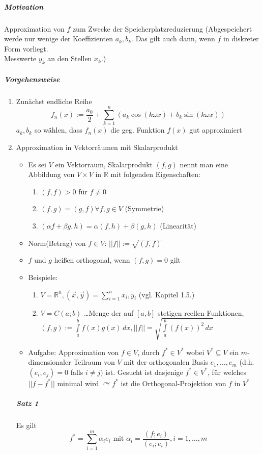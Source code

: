 \documentclass[a4paper]{scrartcl}
\begin{document}
\subparagraph{Motivation} Approximation von $f$ zum Zwecke der Speicherplatzreduzierung (Abgespeichert werde nur wenige der Koeffizienten $a_k,b_k$. Das gilt auch dann, wenn $f$ in diskreter Form vorliegt.\\
Messwerte $y_k$ an den Stellen $x_k$.)

\subparagraph{Vorgehensweise}
\begin{enumerate}
\item Zunächst endliche Reihe
\begin{equation}\label{4521} f_n(x) := \frac{a_0}{2} + \sum\limits_{k=1}^{n} (a_k \cos{(k\omega x)} + b_k \sin{(k\omega x)} )
\end{equation}
$a_k,b_k$ so wählen, dass $f_n(x)$ die geg. Funktion  $f(x) $ gut approximiert
\item Approximation in Vektorräumen mit Skalarprodukt
\begin{itemize}
\item Es sei $V$ ein Vektorraum, Skalarprodukt $(f,g)$ nennt man eine Abbildung von $V \times V$ in $\mathbb{R}$ mit folgenden Eigenschaften:
\begin{enumerate}
\item $(f,f) > 0$ für $f\neq 0$
\item $(f,g) = (g,f) \forall f,g \in V$ (Symmetrie)
\item $(\alpha f + \beta g,h) = \alpha(f,h) + \beta (g,h)$ (Linearität)
\end{enumerate}
\item Norm(Betrag) von $f\in V: \, \lvert \lvert f \rvert \rvert := \sqrt{(f,f)}$
\item $f$ und $g$ heißen orthogonal, wenn $(f,g) =0$ gilt
\item Beispiele: 
\begin{enumerate}
\item $V= \mathbb{R}^n , (\vec{x},\vec{y}) = \sum\limits_{i=1}^{n} x_i,y_i$ (vgl. Kapitel 1.5.)
\item $V=C(a;b)$ \dots Menge der auf $[a,b]$ stetigen reellen Funktionen, $(f,g) := \int\limits_{a}^b f(x) g(x) \, dx, \lvert \lvert f \rvert \rvert = \sqrt{\int\limits_{a}^{b} (f(x))^2 \, dx}$
\end{enumerate}
\item Aufgabe: Approximation von $f \in V$, durch $f^* \in V^* $ wobei $V^* \subseteq V$ ein $m$-dimensionaler Teilraum von $V$ mit der orthogonalen Basis $e_1,\dots,e_m$ (d.h. $(e_i,e_j) = 0$ falls $i\neq j)$ ist. Gesucht ist dasjenige $f^* \in V^*$, für welches $\lvert \lvert f - f^* \rvert \rvert$ minimal wird $\curvearrowright f^*$ ist die Orthogonal-Projektion von $f$ in $V^*$
\end{itemize}
\subparagraph{Satz 1} Es gilt
\[ f^* = \sum\limits_{i=1}^{m} \alpha_i e_i \text{ mit } \alpha_i = \frac{(f;e_i)}{(e_i;e_i)}, i=1, \dots , m \]


\end{enumerate}
\end{document}
